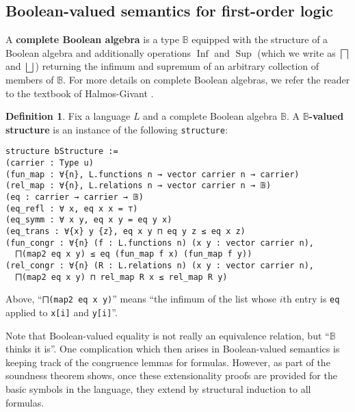 \documentclass[a4paper,USenglish,cleveref, autoref]{lipics-v2019}
\newcommand{\B}{\mathbb{B}}
\newcommand{\lil}{\lstinline}
\theoremstyle{theorem}
\theoremstyle{definition}
\newtheorem{defn}[definition]{Definition}
\begin{document}
\subsection{Boolean-valued semantics for first-order logic}

A \textbf{complete Boolean algebra} is a type $\B$ equipped with the structure of a Boolean algebra and additionally operations $\operatorname{Inf}$ and $\operatorname{Sup}$ (which we write as $\bigsqcap$ and $\bigsqcup$) returning the infimum and supremum of an arbitrary collection of members of $\B$. For more details on complete Boolean algebras, we refer the reader to the textbook of Halmos-Givant \cite{givant2008introduction}.

\begin{defn}\label{def-boolean-valued-structure}
  Fix a language $L$ and a complete Boolean algebra $\B$. %
  A \textbf{$\B$-valued structure} is an instance of the following \lil{structure}:
  \begin{lstlisting}
structure bStructure :=
(carrier : Type u)
(fun_map : ∀{n}, L.functions n → vector carrier n → carrier)
(rel_map : ∀{n}, L.relations n → vector carrier n → 𝔹)
(eq : carrier → carrier → 𝔹)
(eq_refl : ∀ x, eq x x = ⊤)
(eq_symm : ∀ x y, eq x y = eq y x)
(eq_trans : ∀{x} y {z}, eq x y ⊓ eq y z ≤ eq x z)
(fun_congr : ∀{n} (f : L.functions n) (x y : vector carrier n),
  ⨅(map2 eq x y) ≤ eq (fun_map f x) (fun_map f y))
(rel_congr : ∀{n} (R : L.relations n) (x y : vector carrier n),
  ⨅(map2 eq x y) ⊓ rel_map R x ≤ rel_map R y)
\end{lstlisting}
Above, ``\lstinline{⨅(map2 eq x y)}'' means ``the infimum of the list whose $i$th entry is \lil{eq} applied to \lil{x[i]} and \lil{y[i]}''.
\end{defn}
Note that Boolean-valued equality is not really an equivalence relation, but ``$\B$ thinks it is''. One complication which then arises in Boolean-valued semantics is keeping track of the congruence lemmas for formulas. However, as part of the soundness theorem shows, once these extensionality proofs are provided for the basic symbols in the language, they extend by structural induction to all formulas.
\end{document}
